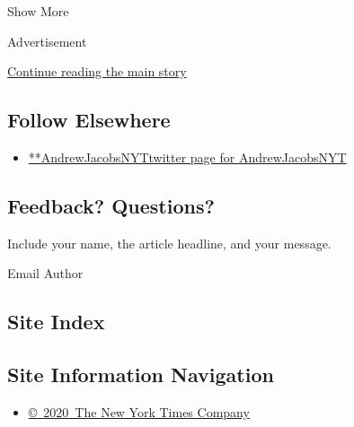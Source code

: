 Show More

Advertisement

\protect\hyperlink{after-mid2}{Continue reading the main story}

\hypertarget{follow-elsewhere}{%
\subsection{Follow Elsewhere}\label{follow-elsewhere}}

\begin{itemize}
\tightlist
\item
  \href{https://twitter.com/AndrewJacobsNYT}{**AndrewJacobsNYTtwitter
  page for AndrewJacobsNYT}
\end{itemize}

\hypertarget{feedback-questions}{%
\subsection{Feedback? Questions?}\label{feedback-questions}}

Include your name, the article headline, and your message.

Email Author

\hypertarget{site-index}{%
\subsection{Site Index}\label{site-index}}

\hypertarget{site-information-navigation}{%
\subsection{Site Information
Navigation}\label{site-information-navigation}}

\begin{itemize}
\tightlist
\item
  \href{https://help.nytimes3xbfgragh.onion/hc/en-us/articles/115014792127-Copyright-notice}{©~2020~The
  New York Times Company}
\end{itemize}

